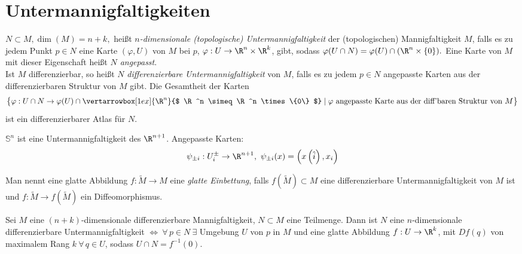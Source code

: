 \section{Untermannigfaltigkeiten}

\begin{defn}
	$ N \subset M, \dim(M) = n+k, $ heißt \emph{$n$-dimensionale (topologische) Untermannigfaltigkeit} der (topologischen) Mannigfaltigkeit $M$, falls es zu jedem Punkt $p \in N$ eine Karte $ (\varphi,U)$ von $M$ bei $p$, $ \varphi: U \to \R^n \times \R^k $, gibt, sodass $ \varphi(U \cap N) = \varphi(U) \cap (\R^n \times \{0\}). $ Eine Karte von $M$ mit dieser Eigenschaft heißt \emph{$N$ angepasst}.\\
	Ist $M$ differenzierbar, so heißt $N$ \emph{differenzierbare Untermannigfaltigkeit} von $M$, falls es zu jedem $p \in N$ angepasste Karten aus der differenzierbaren Struktur von $M$ gibt. Die Gesamtheit der Karten 
	$$ \big\{ \varphi: U \cap N \to \varphi(U) \cap \vertarrowbox[1ex]{\R^n}{$ \R^n \simeq \R^n \times \{0\} $} \mid \varphi\ \text{angepasste Karte aus der diff'baren Struktur von } M \big\} $$
	ist ein differenzierbarer Atlas für $N$.
	\begin{exmp*}
		$ \mathbb{S}^n $ ist eine Untermannigfaltigkeit des $\R^{n+1}$. Angepasste Karten:
		\[ \psi_{\pm i}: U_i^\pm \to \R^{n+1},\ \psi_{\pm i}(x) = \left( x \left( \hat{i} \right),x_i \right) \]
	\end{exmp*}
	Man nennt eine glatte Abbildung $ f: \tilde{M} \to M $ eine \emph{glatte Einbettung}, falls $ f\left( \tilde{M} \right) \subset M $ eine differenzierbare Untermannigfaltigkeit von $M$ ist und $ f: \tilde{M} \to f\left( \tilde{M} \right) $ ein Diffeomorphismus.
\end{defn}

\begin{thm}
	Sei $M$ eine $(n+k)$-dimensionale differenzierbare Mannigfaltigkeit, $ N \subset M$ eine Teilmenge. Dann ist $N$ eine $n$-dimensionale differenzierbare Untermannigfaltigkeit $ \iff \ \forall\, p \in N \ \exists $ Umgebung $U$ von $p$ in $M$ und eine glatte Abbildung $ f: U \to \R^k$, mit $ Df(q) $ von maximalem Rang $k\ \forall\, q \in U$, sodass $ U \cap N = f^{-1}(0). $
\end{thm}

\addtocounter{lecture}{1}

